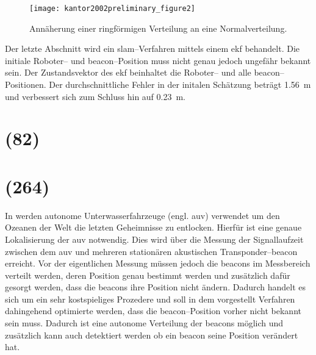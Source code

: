 \begin{figure}[htbp]
	\centering
	\texttt{[image: kantor2002preliminary\_figure2]}
	\caption{Annäherung einer ringförmigen Verteilung an eine Normalverteilung.}
	\label{fig:kantor2002preliminary_figure2}
\end{figure}

Der letzte Abschnitt wird ein \Gls{slam}--Verfahren mittels einem \Gls{ekf} behandelt. Die initiale Roboter-- und \Gls{beacon}--Position muss nicht genau jedoch ungefähr bekannt sein. Der Zustandsvektor des \Gls{ekf} beinhaltet die Roboter-- und alle \Gls{beacon}--Positionen. Der durchschnittliche Fehler in der initalen Schätzung beträgt \SI{1.56}{\metre} und verbessert sich zum Schluss hin auf \SI{0.23}{\metre}.


\begin{comment}
------------------------------------------------------------------------------------------
\end{comment}
\section{(82)}


\begin{comment}
------------------------------------------------------------------------------------------
- Wie funktioniert die Exploration Strategy?
	- Die Ungünstigeste strategy ist das geradeausfahren mit einem beacon links und rechts.
	- Das Gradientenfeld der abstanddifferenz zwischen den beiden beacons führt einen auf den optimalen weg um die Abstandsdifferenz zu maximieren. (Aktive Exploration)
\end{comment}
\section{(264)}

In \cite{olson2004robust} werden autonome Unterwasserfahrzeuge (engl. \gls{auv}) verwendet um den Ozeanen der Welt die letzten Geheimnisse zu entlocken. Hierfür ist eine genaue Lokalisierung der \gls{auv} notwendig. Dies wird über die Messung der Signallaufzeit zwischen dem \gls{auv} und mehreren stationären akustischen Transponder--\Gls{beacon} erreicht. Vor der eigentlichen Messung müssen jedoch die \Glspl{beacon} im Messbereich verteilt werden, deren Position genau bestimmt werden und zusätzlich dafür gesorgt werden, dass die \Glspl{beacon} ihre Position nicht ändern. Dadurch handelt es sich um ein sehr kostspieliges Prozedere und soll in dem vorgestellt Verfahren dahingehend optimierte werden, dass die \Gls{beacon}--Position vorher nicht bekannt sein muss. Dadurch ist eine autonome Verteilung der \Glspl{beacon} möglich und zusätzlich kann auch detektiert werden ob ein \Gls{beacon} seine Position verändert hat.

